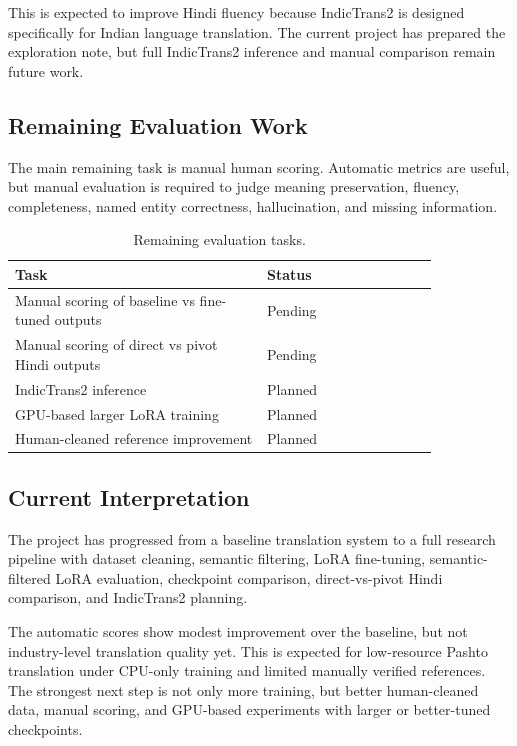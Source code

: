 \documentclass[conference]{IEEEtran}
\begin{document}
This is expected to improve Hindi fluency because IndicTrans2 is designed specifically for Indian language translation. The current project has prepared the exploration note, but full IndicTrans2 inference and manual comparison remain future work.

\subsection{Remaining Evaluation Work}

The main remaining task is manual human scoring. Automatic metrics are useful, but manual evaluation is required to judge meaning preservation, fluency, completeness, named entity correctness, hallucination, and missing information.

\begin{table}[H]
\centering
\caption{Remaining evaluation tasks.}
\footnotesize
\begin{tabular}{p{0.50\linewidth}p{0.34\linewidth}}
\toprule
\textbf{Task} & \textbf{Status} \\
\midrule
Manual scoring of baseline vs fine-tuned outputs & Pending \\
Manual scoring of direct vs pivot Hindi outputs & Pending \\
IndicTrans2 inference & Planned \\
GPU-based larger LoRA training & Planned \\
Human-cleaned reference improvement & Planned \\
\bottomrule
\end{tabular}
\end{table}

\subsection{Current Interpretation}

The project has progressed from a baseline translation system to a full research pipeline with dataset cleaning, semantic filtering, LoRA fine-tuning, semantic-filtered LoRA evaluation, checkpoint comparison, direct-vs-pivot Hindi comparison, and IndicTrans2 planning.

The automatic scores show modest improvement over the baseline, but not industry-level translation quality yet. This is expected for low-resource Pashto translation under CPU-only training and limited manually verified references. The strongest next step is not only more training, but better human-cleaned data, manual scoring, and GPU-based experiments with larger or better-tuned checkpoints.
\end{document}
